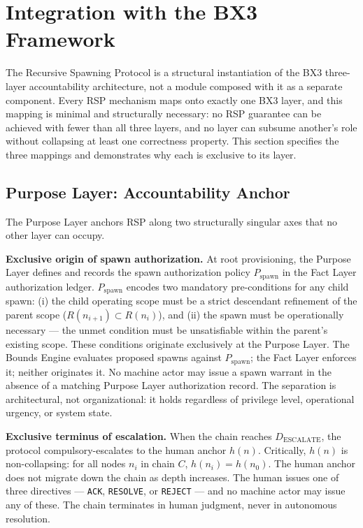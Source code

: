 \section{Integration with the BX3 Framework}
\label{sec:rs-integration}

The Recursive Spawning Protocol is a structural instantiation of the BX3 three-layer accountability architecture, not a module composed with it as a separate component. Every RSP mechanism maps onto exactly one BX3 layer, and this mapping is minimal and structurally necessary: no RSP guarantee can be achieved with fewer than all three layers, and no layer can subsume another's role without collapsing at least one correctness property. This section specifies the three mappings and demonstrates why each is exclusive to its layer.

\subsection{Purpose Layer: Accountability Anchor}
\label{sec:rs-purpose-anchor}

The Purpose Layer anchors RSP along two structurally singular axes that no other layer can occupy.

\medskip
\noindent\textbf{Exclusive origin of spawn authorization.} At root provisioning, the Purpose Layer defines and records the spawn authorization policy $P_{\mathrm{spawn}}$ in the Fact Layer authorization ledger. $P_{\mathrm{spawn}}$ encodes two mandatory pre-conditions for any child spawn: (i) the child operating scope must be a strict descendant refinement of the parent scope ($R(n_{i+1}) \subset R(n_i)$), and (ii) the spawn must be operationally necessary --- the unmet condition must be unsatisfiable within the parent's existing scope. These conditions originate exclusively at the Purpose Layer. The Bounds Engine evaluates proposed spawns against $P_{\mathrm{spawn}}$; the Fact Layer enforces it; neither originates it. No machine actor may issue a spawn warrant in the absence of a matching Purpose Layer authorization record. The separation is architectural, not organizational: it holds regardless of privilege level, operational urgency, or system state.

\medskip
\noindent\textbf{Exclusive terminus of escalation.} When the chain reaches $D_{\mathrm{ESCALATE}}$, the protocol compulsory-escalates to the human anchor $h(n)$. Critically, $h(n)$ is non-collapsing: for all nodes $n_i$ in chain $C$, $h(n_i) = h(n_0)$. The human anchor does not migrate down the chain as depth increases. The human issues one of three directives --- \texttt{ACK}, \texttt{RESOLVE}, or \texttt{REJECT} --- and no machine actor may issue any of these. The chain terminates in human judgment, never in autonomous resolution.


